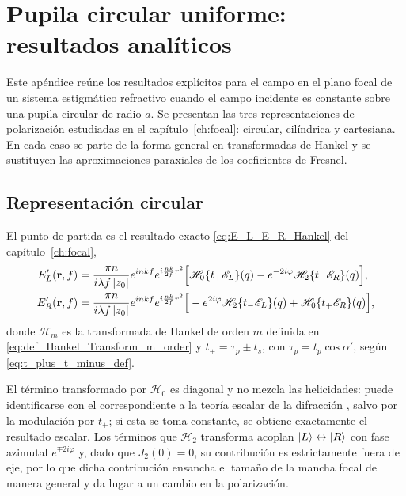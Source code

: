 \chapter{Pupila circular uniforme: resultados analíticos}
\label{apx:focal_forms}

Este apéndice reúne los resultados explícitos para el campo en el plano focal de un sistema estigmático refractivo cuando el campo incidente es constante sobre una pupila circular de radio $a$. Se presentan las tres representaciones de polarización estudiadas en el capítulo~\ref{ch:focal}: circular, cilíndrica y cartesiana. En cada caso se parte de la forma general en transformadas de Hankel y se sustituyen las aproximaciones paraxiales de los coeficientes de Fresnel.

\section{Representación circular}

El punto de partida es el resultado exacto \eqref{eq:E_L_E_R_Hankel} del capítulo~\ref{ch:focal},
\begin{equation}
\begin{aligned}
E'_L(\vb r,f)
&=
\frac{\pi n}{i\lambda f\,|z_0|}
e^{inkf}
e^{i\frac{nk}{2f}r^2}
\Big[
\mathscr H_0\{t_+\mathscr E_L\}(q)
-
e^{-2i\varphi}
\mathscr H_2\{t_-\mathscr E_R\}(q)
\Big],
\\
E'_R(\vb r,f)
&=
\frac{\pi n}{i\lambda f\,|z_0|}
e^{inkf}
e^{i\frac{nk}{2f}r^2}
\Big[
-e^{2i\varphi} \mathscr H_2\{t_-\mathscr E_L\}(q)
+
\mathscr H_0\{t_+\mathscr E_R\}(q)
\Big],
\end{aligned}
\label{eq:E_L_E_R_Hankel_recall}
\end{equation}
donde $\mathscr H_m$ es la transformada de Hankel de orden $m$ definida en
\eqref{eq:def_Hankel_Transform_m_order} y $t_\pm=\tau_p\pm t_s$, con $\tau_p=t_p\cos\alpha'$, según
\eqref{eq:t_plus_t_minus_def}.

El término transformado por $\mathscr{H}_0$ es diagonal y no mezcla las helicidades: puede identificarse con el correspondiente a la teoría escalar de la difracción \cite{goodman2005}, salvo por la modulación por $t_+$; si esta se toma constante, se obtiene exactamente el resultado escalar. Los términos que $\mathscr{H}_2$ transforma acoplan $\ket{L}\leftrightarrow\ket{R}$ con fase azimutal $e^{\mp 2i\varphi}$ y, dado que $J_2(0)=0$, su contribución es estrictamente fuera de eje, por lo que dicha contribución ensancha el tamaño de la mancha focal de manera general y da lugar a un cambio en la polarización.

